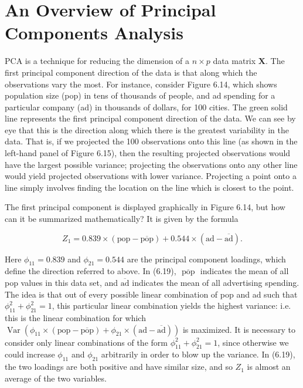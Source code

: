 \documentclass[10pt]{article}
\begin{document}
\section*{An Overview of Principal Components Analysis}
PCA is a technique for reducing the dimension of a $n \times p$ data matrix $\mathbf{X}$. The first principal component direction of the data is that along which the observations vary the most. For instance, consider Figure 6.14, which shows population size (pop) in tens of thousands of people, and ad spending for a particular company (ad) in thousands of dollars, for 100 cities. The green solid line represents the first principal component direction of the data. We can see by eye that this is the direction along which there is the greatest variability in the data. That is, if we projected the 100 observations onto this line (as shown in the left-hand panel of Figure 6.15), then the resulting projected observations would have the largest possible variance; projecting the observations onto any other line would yield projected observations with lower variance. Projecting a point onto a line simply involves finding the location on the line which is closest to the point.

The first principal component is displayed graphically in Figure 6.14, but how can it be summarized mathematically? It is given by the formula


\begin{equation*}
Z_{1}=0.839 \times(\mathrm{pop}-\overline{\mathrm{pop}})+0.544 \times(\mathrm{ad}-\overline{\mathrm{ad}}) . \tag{6.19}
\end{equation*}


Here $\phi_{11}=0.839$ and $\phi_{21}=0.544$ are the principal component loadings, which define the direction referred to above. In (6.19), $\overline{\text { pop }}$ indicates the mean of all pop values in this data set, and $\overline{\mathrm{ad}}$ indicates the mean of all advertising spending. The idea is that out of every possible linear combination of pop and ad such that $\phi_{11}^{2}+\phi_{21}^{2}=1$, this particular linear combination yields the highest variance: i.e. this is the linear combination for which $\operatorname{Var}\left(\phi_{11} \times(\mathrm{pop}-\overline{\mathrm{pop}})+\phi_{21} \times(\mathrm{ad}-\overline{\mathrm{ad}})\right)$ is maximized. It is necessary to consider only linear combinations of the form $\phi_{11}^{2}+\phi_{21}^{2}=1$, since otherwise we could increase $\phi_{11}$ and $\phi_{21}$ arbitrarily in order to blow up the variance. In (6.19), the two loadings are both positive and have similar size, and so $Z_{1}$ is almost an average of the two variables.
\end{document}
